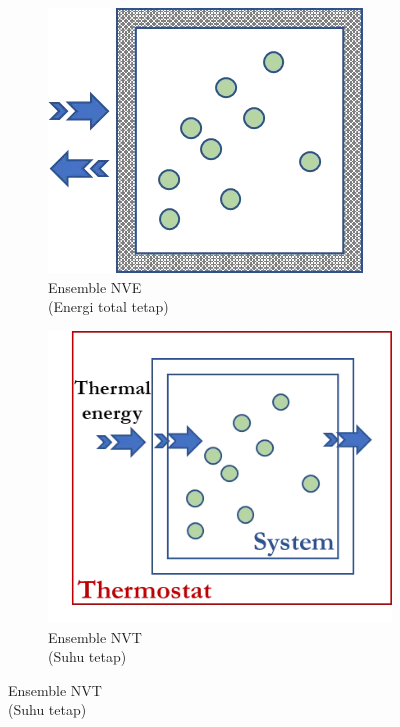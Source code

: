 \begin{figure}[H]
    \centering
    \begin{subfigure}[b]{0.45\textwidth}
        \centering
        \includegraphics[width=\textwidth]{gambar/NVE.png}
        \caption{Ensemble NVE \\ (Energi total tetap)}
        \label{fig:nve}
    \end{subfigure}
    
    \vspace{1em}  %
    
    \begin{subfigure}[b]{0.45\textwidth}
        \centering
        \includegraphics[width=\textwidth]{gambar/NVT.png}
        \caption{Ensemble NVT \\ (Suhu tetap)}
        \label{fig:nvt}
    \end{subfigure}
    

\end{figure}
